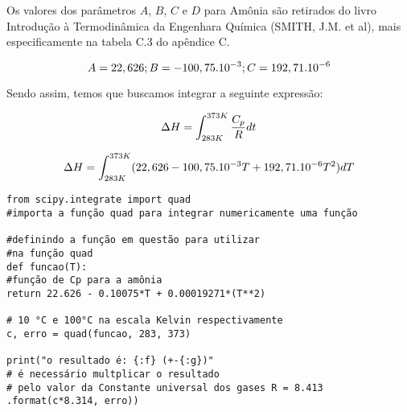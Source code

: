 Os valores dos parâmetros $A$, $B$, $C$ e $D$ para Amônia são retirados do livro Introdução à Termodinâmica da Engenhara Química (SMITH, J.M. et al), mais especificamente na tabela C.3 do apêndice C.

$$\Large A=22,626; B=-100,75.10^{-3}; C = 192,71.10^{-6}$$

Sendo assim, temos que buscamos integrar a seguinte expressão:

$$\Large \Delta H = \int_{283K}^{373K} \frac{C_{p}}{R}dt$$

$$\Large \Delta H = \int_{283K}^{373K} (22,626 - 100,75.10^{-3}T + 192,71.10^{-6}T^2)dT$$

\begin{verbatim}
from scipy.integrate import quad
#importa a função quad para integrar numericamente uma função

#definindo a função em questão para utilizar 
#na função quad
def funcao(T):
#função de Cp para a amônia 
return 22.626 - 0.10075*T + 0.00019271*(T**2) 

# 10 °C e 100°C na escala Kelvin respectivamente
c, erro = quad(funcao, 283, 373) 

print("o resultado é: {:f} (+-{:g})"
# é necessário multplicar o resultado 
# pelo valor da Constante universal dos gases R = 8.413
.format(c*8.314, erro)) 
\end{verbatim}